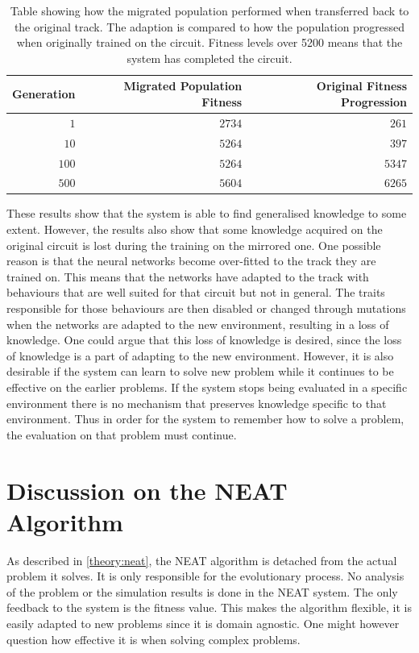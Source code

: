 \begin{table}[H] 
  \centering
  \begin{tabular}{rrr}
    \toprule
    Generation & Migrated Population Fitness & Original Fitness Progression\\
    \midrule
    $1$     & $2734$ & $261$    \\
    $10$    & $5264$ & $397$    \\
    $100$   & $5264$ & $5347$   \\
    $500$   & $5604$ & $6265$   \\
    \bottomrule
  \end{tabular}
  \caption{Table showing how the migrated population performed when transferred back to the original track. The adaption is compared to how the population progressed when originally trained on the circuit. Fitness levels over 5200 means that the system has completed the circuit.}
  \label{tab:mirrored_back}
\end{table}

These results show that the system is able to find generalised knowledge to some extent. However, the results also show that some knowledge acquired on the original circuit is lost during the training on the mirrored one. One possible reason is that the neural networks become over-fitted to the track they are trained on. This means that the networks have adapted to the track with behaviours that are well suited for that circuit but not in general. The traits responsible for those behaviours are then disabled or changed through mutations when the networks are adapted to the new environment, resulting in a loss of knowledge. One could argue that this loss of knowledge is desired, since the loss of knowledge is a part of adapting to the new environment. However, it is also desirable if the system can learn to solve new problem while it continues to be effective on the earlier problems. If the system stops being evaluated in a specific environment there is no mechanism that preserves knowledge specific to that environment. Thus in order for the system to remember how to solve a problem, the evaluation on that problem must continue. 

\section{Discussion on the NEAT Algorithm}
\label{discussion:neat_mechanism}
As described in \ref{theory:neat}, the NEAT algorithm is detached from the actual problem it solves. It is only responsible for the evolutionary process. No analysis of the problem or the simulation results is done in the NEAT system. The only feedback to the system is the fitness value. This makes the algorithm flexible, it is easily adapted to new problems since it is domain agnostic. One might however question how effective it is when solving complex problems.  

